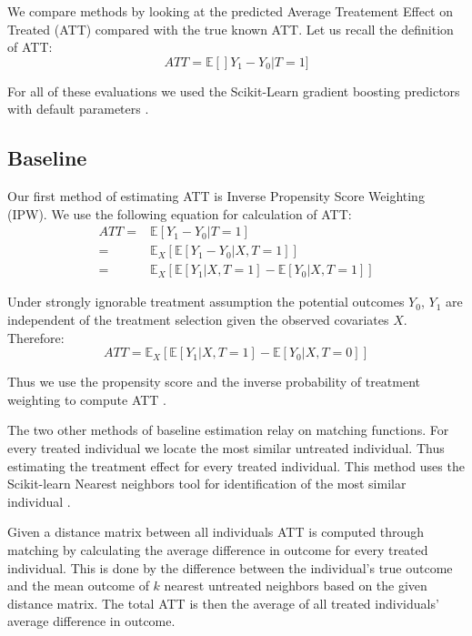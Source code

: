 \documentclass{article}
\begin{document}
We compare methods by looking at the predicted Average Treatement Effect on Treated (ATT) compared with the true known ATT. Let us recall the definition of ATT:
\begin{equation*}
    ATT = \mathbb{E}[]Y_1 - Y_0 | T=1]
\end{equation*}

For all of these evaluations we used the Scikit-Learn gradient boosting predictors with default parameters \cite{scikit-learn}. 

\subsection{Baseline}
Our first method of estimating ATT is Inverse Propensity Score Weighting (IPW).
We use the following equation for calculation of ATT:
\begin{equation*}
    \begin{split}
        ATT = & \mathbb{E}[Y_1 - Y_0 | T=1] \\
        = & \mathbb{E}_X[\mathbb{E}[Y_1 - Y_0 | X, T=1]] \\
        = & \mathbb{E}_X[\mathbb{E}[Y_1 | X, T=1] - \mathbb{E}[Y_0 | X, T=1]]
    \end{split}
\end{equation*}

Under strongly ignorable treatment assumption the potential outcomes $Y_0$, $Y_1$ are independent of the treatment selection given the observed covariates $X$. Therefore:
\begin{equation*}
    ATT = \mathbb{E}_X[\mathbb{E}[Y_1|X, T=1] - \mathbb{E}[Y_0 | X, T=0]]
\end{equation*}

Thus we use the propensity score and the inverse probability of treatment weighting to compute ATT \cite{abdia2017propensity}. 

The two other methods of baseline estimation relay on matching functions. For every treated individual we locate the most similar untreated individual. Thus estimating the treatment effect for every treated individual. This method uses the Scikit-learn Nearest neighbors tool for identification of the most similar individual \cite{scikit-learn}. 

Given a distance matrix between all individuals ATT is computed through matching by calculating the average difference in outcome for every treated individual. This is done by the difference between the individual's true outcome and the mean outcome of $k$ nearest untreated neighbors based on the given distance matrix. The total ATT is then the average of all treated individuals' average difference in outcome.
\end{document}
